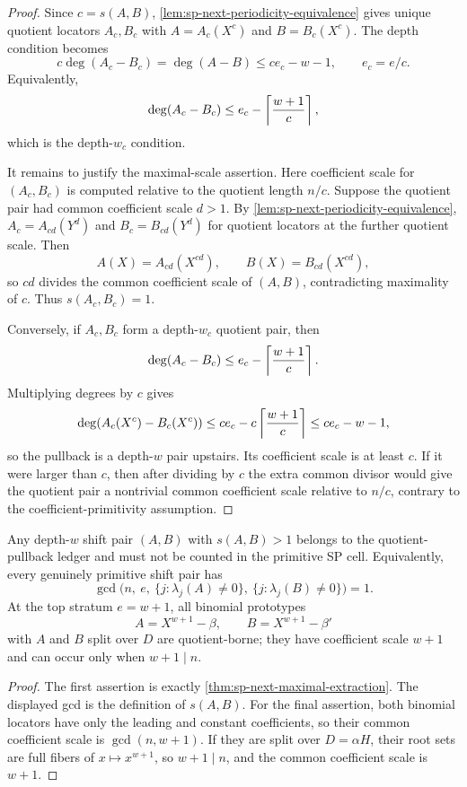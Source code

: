\begin{proof}
Since \(c=s(A,B)\), \cref{lem:sp-next-periodicity-equivalence} gives
unique quotient locators \(A_c,B_c\) with \(A=A_c(X^c)\) and \(B=B_c(X^c)\).
The depth condition becomes
\[
        c\deg(A_c-B_c)=\deg(A-B)\le ce_c-w-1,\qquad e_c=e/c.
\]
Equivalently,
\[
        \deg(A_c-B_c)\le e_c-\left\lceil {w+1\over c}\right\rceil,
\]
which is the depth-\(w_c\) condition.

It remains to justify the maximal-scale assertion.  Here coefficient scale for
\((A_c,B_c)\) is computed relative to the quotient length \(n/c\).  Suppose
the quotient pair had common coefficient scale \(d>1\).  By
\cref{lem:sp-next-periodicity-equivalence}, \(A_c=A_{cd}(Y^d)\) and
\(B_c=B_{cd}(Y^d)\) for quotient locators at the further quotient scale.
Then
\[
        A(X)=A_{cd}(X^{cd}),\qquad B(X)=B_{cd}(X^{cd}),
\]
so \(cd\) divides the common coefficient scale of \((A,B)\), contradicting
maximality of \(c\).  Thus \(s(A_c,B_c)=1\).

Conversely, if \(A_c,B_c\) form a depth-\(w_c\) quotient pair, then
\[
        \deg(A_c-B_c)\le e_c-\left\lceil {w+1\over c}\right\rceil .
\]
Multiplying degrees by \(c\) gives
\[
        \deg(A_c(X^c)-B_c(X^c))
        \le ce_c-c\left\lceil {w+1\over c}\right\rceil
        \le ce_c-w-1,
\]
so the pullback is a depth-\(w\) pair upstairs.  Its coefficient scale is at
least \(c\).  If it were larger than \(c\), then after dividing by \(c\) the
extra common divisor would give the quotient pair a nontrivial common
coefficient scale relative to \(n/c\), contrary to the coefficient-primitivity
assumption.
\end{proof}

\begin{corollary}
\label{cor:sp-next-primitive-exclusion}
Any depth-\(w\) shift pair \((A,B)\) with \(s(A,B)>1\) belongs to the
quotient-pullback ledger and must not be counted in the primitive SP cell.
Equivalently, every genuinely primitive shift pair has
\[
        \gcd\bigl(n,\ e,\ \{j:\lambda_j(A)\ne0\},\ \{j:\lambda_j(B)\ne0\}\bigr)=1 .
\]
At the top stratum \(e=w+1\), all binomial prototypes
\[
        A=X^{w+1}-\beta,\qquad B=X^{w+1}-\beta'
\]
with \(A\) and \(B\) split over \(D\) are quotient-borne; they have
coefficient scale \(w+1\) and can occur only when \(w+1\mid n\).
\end{corollary}

\begin{proof}
The first assertion is exactly \cref{thm:sp-next-maximal-extraction}.  The
displayed gcd is the definition of \(s(A,B)\).  For the final assertion,
both binomial locators have only the leading and constant coefficients, so
their common coefficient scale is \(\gcd(n,w+1)\).  If they are split over
\(D=\alpha H\), their root sets are full fibers of \(x\mapsto x^{w+1}\), so
\(w+1\mid n\), and the common coefficient scale is \(w+1\).
\end{proof}

